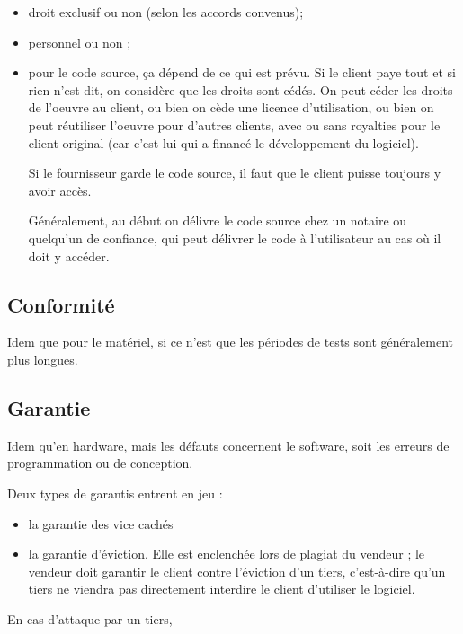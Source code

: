 		\begin{itemize}
			\item droit exclusif ou non (selon les accords convenus);
			\item personnel ou non ; 
			\item pour le code source, ça dépend de ce qui est prévu. Si le client paye tout et si rien n'est dit, on considère que les droits sont cédés. On peut céder les droits de l'oeuvre au client, ou bien on cède une licence d'utilisation, ou bien on peut réutiliser l'oeuvre pour d'autres clients, avec ou sans royalties pour le client original (car c'est lui qui a financé le développement du logiciel).
			
			Si le fournisseur garde le code source, il faut que le client puisse toujours y avoir accès.
			
			Généralement, au début on délivre le code source chez un notaire ou quelqu'un de confiance, qui peut délivrer le code à l'utilisateur au cas où il doit y accéder.			
			
		\end{itemize}
	
	
		\subsection{Conformité}
		
		Idem que pour le matériel, si ce n'est que les périodes de tests sont généralement plus longues.
		
		\subsection{Garantie}
		
		Idem qu'en hardware, mais les défauts concernent le software, soit les erreurs de programmation ou de conception.
		
		Deux types de garantis entrent en jeu :
		\begin{itemize}
			\item la garantie des vice cachés
		
			\item la garantie d'éviction. Elle est enclenchée lors de plagiat du vendeur ; le vendeur doit garantir le client contre l'éviction d'un tiers, c'est-à-dire qu'un tiers ne viendra pas directement interdire le client d'utiliser le logiciel.
		\end{itemize}
		
		En cas d'attaque par un tiers,
		
